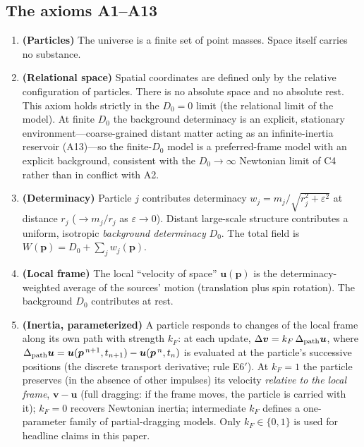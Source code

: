 \documentclass[aps,reprint,amsmath,amssymb,nofootinbib,superscriptaddress,floatfix]{revtex4-2}
\newcommand{\vect}[1]{\bm{#1}}
\newcommand{\Dz}{D_0}
\begin{document}
\subsection{The axioms A1--A13}

\begin{enumerate}
\item[A1.]{\bf (Particles)} The universe is a finite set of point
masses. Space itself carries no substance.

\item[A2.]{\bf (Relational space)} Spatial coordinates are defined only
by the relative configuration of particles. There is no absolute space
and no absolute rest.
This axiom holds strictly in the $\Dz = 0$ limit (the relational
limit of the model).
At finite $\Dz$ the background determinacy is an explicit, stationary
environment---coarse-grained distant matter acting as an
infinite-inertia reservoir (A13)---so the finite-$\Dz$ model is a
preferred-frame model with an explicit background, consistent with the
$\Dz \to \infty$ Newtonian limit of C4 rather than in conflict with
A2.

\item[A3.]{\bf (Determinacy)} Particle $j$ contributes determinacy
$w_j = m_j/\sqrt{r_j^2+\varepsilon^2}$ at distance $r_j$
($\to m_j/r_j$ as $\varepsilon\to 0$).
Distant large-scale structure contributes a uniform, isotropic
\emph{background determinacy} $\Dz$.
The total field is $W(\vect{p}) = \Dz + \sum_j w_j(\vect{p})$.

\item[A4.]{\bf (Local frame)} The local ``velocity of space''
$\vect{u}(\vect{p})$ is the determinacy-weighted average of the
sources' motion (translation plus spin rotation).
The background $\Dz$ contributes at rest.

\item[A5.]{\bf (Inertia, parameterized)} A particle responds to changes
of the local frame along its own path with strength $k_F$:
at each update,
$\Delta\vect{v} = k_F\,\Delta_{\rm path}\vect{u}$, where
$\Delta_{\rm path}\vect{u}
 = \vect{u}(\vect{p}^{\,n+1},t_{n+1}) - \vect{u}(\vect{p}^{\,n},t_n)$
is evaluated at the particle's successive positions (the discrete
transport derivative; rule E6$'$).
At $k_F = 1$ the particle preserves (in the absence of other
impulses) its velocity \emph{relative to the
local frame}, $\vect{v}-\vect{u}$ (full dragging: if the frame moves,
the particle is carried with it); $k_F = 0$ recovers Newtonian inertia;
intermediate $k_F$ defines a one-parameter family of partial-dragging
models.
Only $k_F \in \{0,1\}$ is used for headline claims in this paper.


\end{enumerate}
\end{document}
